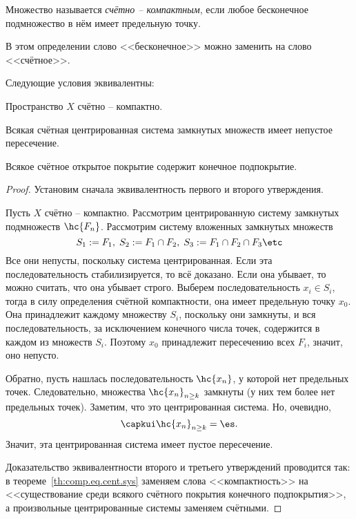 \documentclass[a4paper]{article}
\begin{document}
\begin{df}
Множество называется \emph{счётно -- компактным}, если любое бесконечное подмножество в нём
имеет предельную точку.
\end{df}

\begin{note}
В этом определении слово <<бесконечное>> можно заменить на слово <<счётное>>.
\end{note}

\begin{stm}
Следующие условия эквивалентны:
\begin{items}{-3}
\item Пространство $X$ счётно -- компактно.
\item Всякая счётная центрированная система замкнутых множеств имеет непустое пересечение.
\item Всякое счётное открытое покрытие содержит конечное подпокрытие.
\end{items}
\end{stm}
\begin{proof}
Установим сначала эквивалентность первого и второго утверждения.

Пусть $X$ счётно -- компактно. Рассмотрим центрированную систему замкнутых подмножеств $\hc{F_n}$.
Рассмотрим систему вложенных замкнутых множеств
$$S_1 := F_1,\; S_2 := F_1 \cap F_2,\; S_3 := F_1\cap F_2\cap F_3\etc$$
Все они непусты, поскольку система центрированная. Если эта последовательность стабилизируется,
то всё доказано. Если она убывает, то можно считать, что она убывает строго.
Выберем последовательность $x_i \in S_i$, тогда в силу определения счётной компактности,
она имеет предельную точку $x_0$. Она принадлежит каждому множеству $S_i$, поскольку они замкнуты,
и вся последовательность, за исключением конечного числа точек, содержится в каждом из множеств $S_i$.
Поэтому $x_0$ принадлежит пересечению всех $F_i$, значит, оно непусто.

Обратно, пусть нашлась последовательность $\hc{x_n}$, у которой нет предельных точек.
Следовательно, множества $\hc{x_n}_{n \ge k}$ замкнуты (у них тем более нет предельных
точек). Заметим, что это центрированная система.
Но, очевидно,
$$\capkui \hc{x_n}_{n \ge k} = \es.$$
Значит, эта центрированная система имеет пустое пересечение.

Доказательство эквивалентности второго и третьего утверждений проводится так:
в теореме~\ref{th:comp.eq.cent.sys} заменяем слова <<компактность>> на
<<существование среди всякого счётного покрытия конечного подпокрытия>>,
а произвольные центрированные системы заменяем счётными.
\end{proof}
\end{document}
